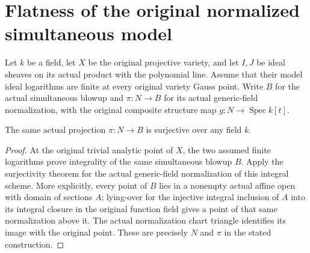 \section{Flatness of the original normalized simultaneous model}

Let $k$ be a field, let $X$ be the original projective variety, and let
$I,J$ be ideal sheaves on its actual product with the polynomial line.
Assume that their model ideal logarithms are finite at every original
variety Gauss point. Write $B$ for the actual simultaneous blowup and
$\pi:N\to B$ for its actual generic-field normalization, with the original
composite structure map $g:N\to\operatorname{Spec}k[t]$.

\begin{lemma}
\label{local:original-normalized-pl-projection-surjective}
\leanok
The same actual projection $\pi:N\to B$ is surjective over any field $k$.
\end{lemma}
\begin{proof}
At the original trivial analytic point of $X$, the two assumed finite
logarithms prove integrality of the same simultaneous blowup $B$.
Apply the surjectivity theorem for the actual generic-field normalization
of this integral scheme. More explicitly, every point of $B$ lies in a
nonempty actual affine open with domain of sections $A$; lying-over for
the injective integral inclusion of $A$ into its integral closure in the
original function field gives a point of that same normalization above it.
The actual normalization chart triangle identifies its image with the
original point. These are precisely $N$ and $\pi$ in the stated construction.
\end{proof}

